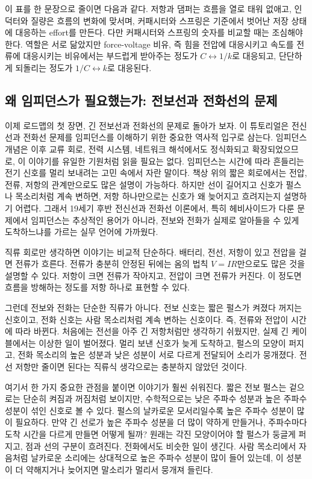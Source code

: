 이 표를 한 문장으로 줄이면 다음과 같다.
저항과 댐퍼는 흐름을 열로 태워 없애고, 인덕터와 질량은 흐름의 변화에 맞서며, 커패시터와 스프링은 기준에서 벗어난 저장 상태에 대응하는 effort를 만든다.
다만 커패시터와 스프링의 숫자를 비교할 때는 조심해야 한다.
역할은 서로 닮았지만 force-voltage 비유, 즉 힘을 전압에 대응시키고 속도를 전류에 대응시키는 비유에서는 부드럽게 받아주는 정도가 $C \leftrightarrow 1/k$로 대응되고, 단단하게 되돌리는 정도가 $1/C \leftrightarrow k$로 대응된다.

\subsection{왜 임피던스가 필요했는가: 전보선과 전화선의 문제}

이제 로드맵의 첫 장면, 긴 전보선과 전화선의 문제로 돌아가 보자.
이 튜토리얼은 전신선과 전화선 문제를 임피던스를 이해하기 위한 중요한 역사적 입구로 삼는다.
임피던스 개념은 이후 교류 회로, 전력 시스템, 네트워크 해석에서도 정식화되고 확장되었으므로, 이 이야기를 유일한 기원처럼 읽을 필요는 없다.
임피던스는 시간에 따라 흔들리는 전기 신호를 멀리 보내려는 고민 속에서 자란 말이다.
책상 위의 짧은 회로에서는 전압, 전류, 저항의 관계만으로도 많은 설명이 가능하다.
하지만 선이 길어지고 신호가 펄스나 목소리처럼 계속 변하면, 저항 하나만으로는 신호가 왜 늦어지고 흐려지는지 설명하기 어렵다.
그래서 19세기 후반 전신선과 전화선 이론에서, 특히 헤비사이드가 다룬 문제에서 임피던스는 추상적인 용어가 아니라, 전보와 전화가 실제로 알아들을 수 있게 도착하느냐를 가르는 실무 언어에 가까웠다.

직류 회로만 생각하면 이야기는 비교적 단순하다.
배터리, 전선, 저항이 있고 전압을 걸면 전류가 흐른다.
전류가 충분히 안정된 뒤에는 옴의 법칙 $V=IR$만으로도 많은 것을 설명할 수 있다.
저항이 크면 전류가 작아지고, 전압이 크면 전류가 커진다.
이 정도면 흐름을 방해하는 정도를 저항 하나로 표현할 수 있다.

그런데 전보와 전화는 단순한 직류가 아니다.
전보 신호는 짧은 펄스가 켜졌다 꺼지는 신호이고, 전화 신호는 사람 목소리처럼 계속 변하는 신호이다.
즉, 전류와 전압이 시간에 따라 바뀐다.
처음에는 전선을 아주 긴 저항처럼만 생각하기 쉬웠지만, 실제 긴 케이블에서는 이상한 일이 벌어졌다.
멀리 보낸 신호가 늦게 도착하고, 펄스의 모양이 퍼지고, 전화 목소리의 높은 성분과 낮은 성분이 서로 다르게 전달되어 소리가 뭉개졌다.
전선 저항만 줄이면 된다는 직류식 생각으로는 충분하지 않았던 것이다.

여기서 한 가지 중요한 관점을 붙이면 이야기가 훨씬 쉬워진다.
짧은 전보 펄스는 겉으로는 단순히 켜짐과 꺼짐처럼 보이지만, 수학적으로는 낮은 주파수 성분과 높은 주파수 성분이 섞인 신호로 볼 수 있다.
펄스의 날카로운 모서리일수록 높은 주파수 성분이 많이 필요하다.
만약 긴 선로가 높은 주파수 성분을 더 많이 약하게 만들거나, 주파수마다 도착 시간을 다르게 만들면 어떻게 될까?
원래는 각진 모양이어야 할 펄스가 둥글게 퍼지고, 점과 선의 구분이 흐려진다.
전화에서도 비슷한 일이 생긴다.
사람 목소리에서 자음처럼 날카로운 소리에는 상대적으로 높은 주파수 성분이 많이 들어 있는데, 이 성분이 더 약해지거나 늦어지면 말소리가 멀리서 뭉개져 들린다.

